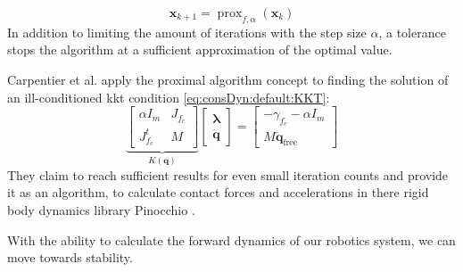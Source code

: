 \begin{equation}
  \bm x_{k+1} = \operatorname{prox}_{f,\alpha}(\bm x_k)
  \label{eq:consDyn:prox:algo}
\end{equation}
In addition to limiting the amount of iterations with the step size $\alpha$, a tolerance stops the algorithm at a sufficient approximation of the optimal value.
\par
Carpentier et al. \cite{carpentier_2021} apply the proximal algorithm concept to finding the solution of an ill-conditioned \acrshort{kkt} condition \cref{eq:consDyn:default:KKT}:
\begin{equation}
  \underbrace{\begin{bmatrix}
  \alpha I_m & J_{f_c} \\
  J_{f_c}^{t} & M
  \end{bmatrix}}_{K(\bm{q})}
  \begin{bmatrix}
  \bm{\lambda} \\
  \bm{\ddot{q}}
  \end{bmatrix}
  =
  \begin{bmatrix}
  -\gamma_{f_c}- \alpha I_m \\
  M \bm{\ddot q}_{\mathrm{free}}
  \end{bmatrix}
  \label{eq:consDyn:prox:KKT}
\end{equation}
They claim to reach sufficient results for even small iteration counts and provide it as an algorithm, to calculate contact forces and accelerations in there rigid body dynamics library Pinocchio \cite{pinocchioweb,carpentier2019pinocchio}.
\par
With the ability to calculate the forward dynamics of our robotics system, we can move towards stability.

